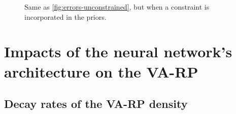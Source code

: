\begin{figure}[h]
    \centering
    \caption{Same as \cref{fig:errors-unconstrained}, but when a constraint is incorporated in the priors.}
    \label{fig:errors-constrained}
\end{figure}









\section{Impacts of the neural network's architecture on the VA-RP}\label{sec:constr-frags:app}




\subsection{Decay rates of the VA-RP density}\label{app:decay-rates}

